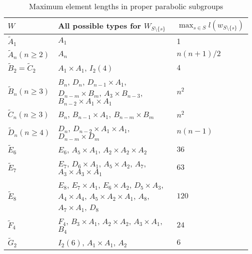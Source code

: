 \begin{table}[ht]
	\centering
	\begin{tabular}{l|p{7cm}|l}
		$W$ & All possible types for $W_{S \setminus \{s\}}$ & $\max_{s \in S} l(w_{S \setminus \{s\}})$ \\
		\hline
		$\tilde A_1$ & $A_1$ & 1 \\
		$\tilde A_n (n \geq 2)$ & $A_n$ & $n(n+1)/2$ \\
		$\tilde B_2 = \tilde C_2$ & $A_1 \times A_1$, $I_2(4)$ & $4$ \\
		$\tilde B_n (n \geq 3)$ & $B_n$, $D_n$, $D_{n-1} \times A_1$, $D_{n-m} \times B_m$, $A_3 \times B_{n-3}$, $B_{n-2} \times A_1 \times A_1$ & $n^2$ \\
		$\tilde C_n (n \geq 3)$ & $B_n$, $B_{n-1} \times A_1$, $B_{n-m} \times B_m$ & $n^2$ \\
		$\tilde D_n (n \geq 4)$ & $D_n$, $D_{n-2} \times A_1 \times A_1$, $D_{n-m} \times D_m$ & $n(n-1)$ \\
		$\tilde E_6$ & $E_6$, $A_5 \times A_1$, $A_2 \times A_2 \times A_2$ & $36$ \\
		$\tilde E_7$ & $E_7$, $D_6 \times A_1$, $A_5 \times A_2$, $A_7$, $A_3 \times A_3 \times A_1$ & $63$ \\
		$\tilde E_8$ & $E_8$, $E_7 \times A_1$, $E_6 \times A_2$, $D_5 \times A_3$, $A_4 \times A_4$, $A_5 \times A_2 \times A_1$, $A_8$, $A_7 \times A_1$, $D_8$ & $120$ \\
		$\tilde F_4$ & $F_4$, $B_3 \times A_1$, $A_2 \times A_2$, $A_3 \times A_1$, $B_4$ & $24$ \\
		$\tilde G_2$ & $I_2(6)$, $A_1 \times A_1$, $A_2$ & $6$ \\
	\end{tabular}
	\caption{Maximum element lengths in proper parabolic subgroups}
	\label{tab:parabolic-max-length}	
\end{table}